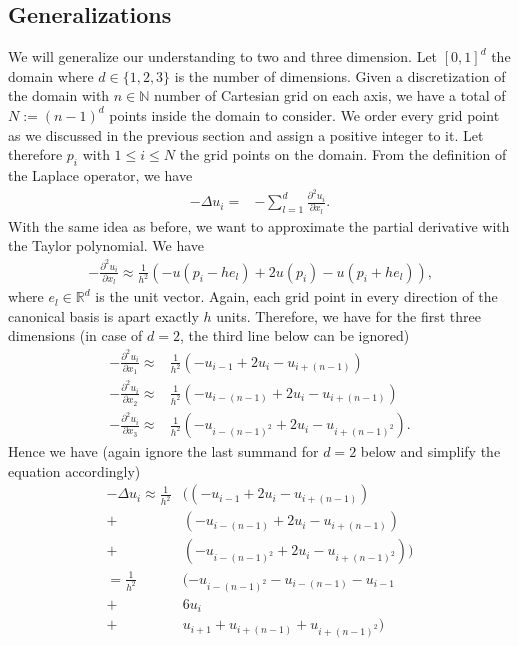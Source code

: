 \subsection{Generalizations}

We will generalize our understanding to two and three dimension. Let \([0, 1]^d\) the domain where \(d \in \{1, 2, 3\} \) is the number of dimensions. Given a discretization of the domain with \(n \in \mathbb{N}\) number of Cartesian grid on each axis, we have a total of \(N := (n-1)^d\) points inside the domain to consider. We order every grid point as we discussed in the previous section and assign a positive integer to it. Let therefore \(p_i\) with \(1 \leq i \leq N\) the grid points on the domain. From the definition of the Laplace operator, we have
\begin{align*}
	-\Delta u_i =& -\sum^d_{l=1}\frac{\partial^2 u_i}{\partial x_l} \text{.}
\end{align*}
With the same idea as before, we want to approximate the partial derivative with the Taylor polynomial. We have
\begin{align*}
	-\frac{\partial^2 u_i}{\partial x_l} \approx \frac{1}{h^2}
	(-u(p_i - h e_l) + 2u(p_i) -u(p_i + h e_l)) \text{,}
\end{align*}
where \(e_l \in \mathbb{R}^{d}\) is the unit vector. Again, each grid point in every direction of the canonical basis is apart exactly \(h\) units. Therefore, we have for the first three dimensions (in case of \(d=2\), the third line below can be ignored)
\begin{align*}
	-\frac{\partial^2 u_i}{\partial x_1} \approx& \frac{1}{h^2}
	(-u_{i - 1} + 2u_i -u_{i + (n - 1)}) \\
	-\frac{\partial^2 u_i}{\partial x_2} \approx& \frac{1}{h^2}
	(-u_{i - (n - 1)} + 2u_i -u_{i + (n - 1)}) \\
	-\frac{\partial^2 u_i}{\partial x_3} \approx& \frac{1}{h^2}
	(-u_{i - (n - 1)^2} + 2u_i -u_{i + (n - 1)^2}) \text{.}
\end{align*}
Hence we have (again ignore the last summand for \(d=2\) below and simplify the equation accordingly)
\begin{align*}
	-\Delta u_i \approx \frac{1}{h^2} & ( (-u_{i - 1} + 2u_i -u_{i + (n - 1)} ) \\
	+&(-u_{i - (n - 1)} + 2u_i -u_{i + (n - 1)}) \\
	+&(-u_{i - (n - 1)^2} + 2u_i -u_{i + (n - 1)^2}) ) \\
	= \frac{1}{h^2} & 
	( -u_{i - (n - 1)^2} -u_{i - (n - 1)} -u_{i - 1} \\
	+& 6u_i \\
	+& u_{i + 1} + u_{i + (n - 1)} + u_{i + (n-1)^2} )
\end{align*}
